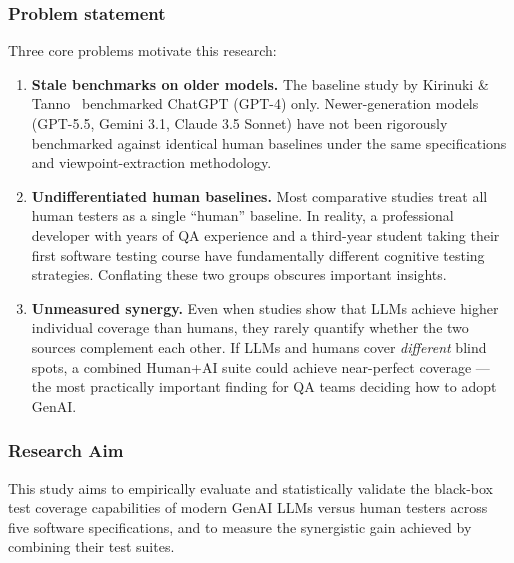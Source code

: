 \documentclass[12pt,a4paper]{article}
\begin{document}
\subsubsection*{Problem statement}
Three core problems motivate this research:
\begin{enumerate}[leftmargin=1.2cm]
    \item \textbf{Stale benchmarks on older models.} The baseline study by Kirinuki \& Tanno~\cite{b1} benchmarked ChatGPT (GPT-4) only. Newer-generation models (GPT-5.5, Gemini 3.1, Claude 3.5 Sonnet) have not been rigorously benchmarked against identical human baselines under the same specifications and viewpoint-extraction methodology.
    \item \textbf{Undifferentiated human baselines.} Most comparative studies treat all human testers as a single ``human'' baseline. In reality, a professional developer with years of QA experience and a third-year student taking their first software testing course have fundamentally different cognitive testing strategies. Conflating these two groups obscures important insights.
    \item \textbf{Unmeasured synergy.} Even when studies show that LLMs achieve higher individual coverage than humans, they rarely quantify whether the two sources complement each other. If LLMs and humans cover \textit{different} blind spots, a combined Human+AI suite could achieve near-perfect coverage --- the most practically important finding for QA teams deciding how to adopt GenAI.
\end{enumerate}

\subsubsection*{Research Aim}
This study aims to empirically evaluate and statistically validate the black-box test coverage capabilities of modern GenAI LLMs versus human testers across five software specifications, and to measure the synergistic gain achieved by combining their test suites.
\end{document}
